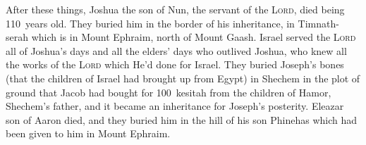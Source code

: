 \begin{inparaenum}
     After these things, Joshua the son of Nun, the servant of the \textsc{Lord}, died being 110~years old.%
     They buried him in the border of his inheritance, in Timnath-serah which is in Mount Ephraim, north of Mount Gaash.%
     Israel served the \textsc{Lord} all of Joshua's days and all the elders' days who outlived Joshua, who knew all the works of the \textsc{Lord} which He'd done for Israel.%
     They buried Joseph's bones (that the children of Israel had brought up from Egypt) in Shechem in the plot of ground that Jacob had bought for 100~kesitah from the children of Hamor, Shechem's father, and it became an inheritance for Joseph's posterity.%
     Eleazar son of Aaron died, and they buried him in the hill of his son Phinehas which had been given to him in Mount Ephraim.%
\end{inparaenum}
